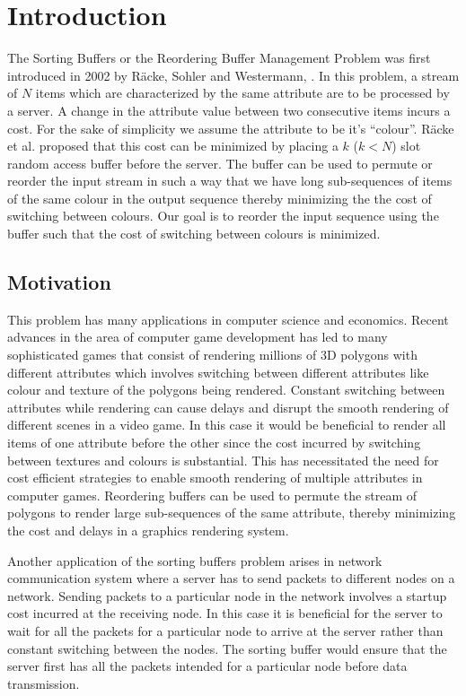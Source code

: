 \chapter{Introduction} \label{ch:intro}

The Sorting Buffers or the Reordering Buffer Management Problem was first
introduced in 2002 by R\"acke, Sohler and Westermann, \cite{racke2002online}. In
this problem, a stream of $N$ items which are characterized by the same
attribute are to be processed by a server. A change in the attribute value
between two consecutive items incurs a cost. For the sake of simplicity we assume the attribute to be it's ``colour''. R\"acke et al. proposed that this cost can be
minimized by placing a $k$ ($k < N$) slot random access buffer before the
server. The buffer can be used to permute or reorder the input stream in such a
way that we have long sub-sequences of items of the same colour in the output sequence thereby minimizing the the cost of switching between colours. Our goal is to reorder the input sequence using the buffer such that the cost of switching between colours is minimized. 

\section{Motivation} \label{motivation}

This problem has many applications in computer science and economics.
Recent advances in the area of computer game development has led to many
sophisticated games that consist of rendering millions of 3D polygons with
different attributes which involves switching
between different attributes like colour and texture of the polygons
being rendered. Constant switching between attributes while rendering can
cause delays and disrupt the smooth rendering of different scenes in a video
game. In this case it would be beneficial to render all items of one attribute 
before the other since the cost incurred by switching between textures and colours is 
substantial. This has necessitated the need for cost efficient strategies to enable
smooth rendering of multiple attributes in computer games. Reordering buffers
can be used to permute the stream of polygons to render large sub-sequences of
the same attribute, thereby minimizing the cost and delays in a graphics
rendering system. 

Another application of the sorting buffers problem arises in network
communication system where a server has to send packets to different nodes on a
network. Sending packets to a particular node in the network involves a
startup cost incurred at the receiving node. In this case it is beneficial for
the server to wait for all the packets for a particular node to arrive at the
server rather than constant switching between the nodes. The sorting buffer would ensure 
that the server first has all the packets intended for a particular node before
data transmission. 

